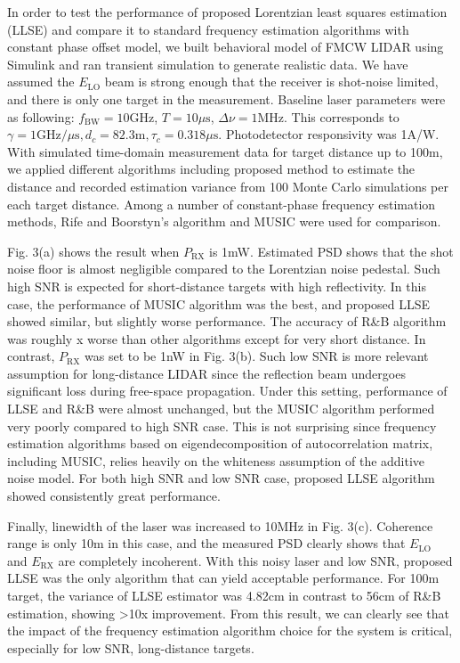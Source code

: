 \documentclass{article}
\begin{document}
In order to test the performance of proposed Lorentzian least squares estimation (LLSE) and compare it to standard frequency estimation algorithms with constant phase offset model, we built behavioral model of FMCW LIDAR using Simulink and ran transient simulation to generate realistic data. We have assumed the $E_\text{LO}$ beam is strong enough that the receiver is shot-noise limited, and there is only one target in the measurement. Baseline laser parameters were as following: $f_\text{BW}=\text{10GHz}$, $T=\text{10}\mu\text{s}$, $\Delta\nu=\text{1MHz}$. This corresponds to $\gamma=\text{1GHz/}\mu\text{s}, d_c=\text{82.3m}, \tau_c=\text{0.318}\mu\text{s}$. Photodetector responsivity was 1A/W. With simulated time-domain measurement data for target distance up to 100m, we applied different algorithms including proposed method to estimate the distance and recorded estimation variance from 100 Monte Carlo simulations per each target distance. Among a number of constant-phase frequency estimation methods, Rife and Boorstyn's algorithm \cite{Lamp86} and MUSIC \cite{Lamp86} were used for comparison.

Fig. 3(a) shows the result when $P_\text{RX}$ is 1mW. Estimated PSD shows that the shot noise floor is almost negligible compared to the Lorentzian noise pedestal. Such high SNR is expected for short-distance targets with high reflectivity. In this case, the performance of MUSIC algorithm was the best, and proposed LLSE showed similar, but slightly worse performance. The accuracy of R\&B algorithm was roughly x worse than other algorithms except for very short distance. In contrast, $P_\text{RX}$ was set to be 1nW in Fig. 3(b). Such low SNR is more relevant assumption for long-distance LIDAR since the reflection beam undergoes significant loss during free-space propagation. Under this setting, performance of LLSE and R\&B were almost unchanged, but the MUSIC algorithm performed very poorly compared to high SNR case. This is not surprising since frequency estimation algorithms based on eigendecomposition of autocorrelation matrix, including MUSIC, relies heavily on the whiteness assumption of the additive noise model. For both high SNR and low SNR case, proposed LLSE algorithm showed consistently great performance. 

Finally, linewidth of the laser was increased to 10MHz in Fig. 3(c). Coherence range is only 10m in this case, and the measured PSD clearly shows that $E_\text{LO}$ and $E_\text{RX}$ are completely incoherent. With this noisy laser and low SNR, proposed LLSE was the only algorithm that can yield acceptable performance. For 100m target, the variance of LLSE estimator was 4.82cm in contrast to 56cm of R\&B estimation, showing \textgreater 10x improvement. From this result, we can clearly see that the impact of the frequency estimation algorithm choice for the system is critical, especially for low SNR, long-distance targets. 
\end{document}
